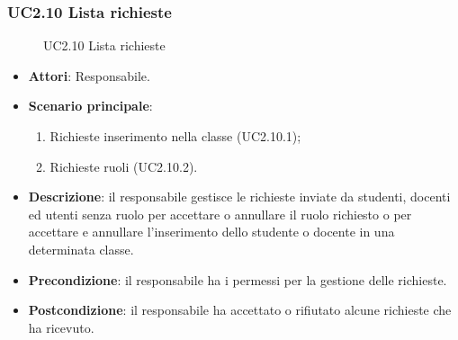 \subsubsection{UC2.10 Lista richieste}
\begin{figure}[H]
\centering
\noindent{}
\caption{UC2.10 Lista richieste}
\end{figure}
\begin{itemize}
\item \textbf{Attori}: Responsabile.
\item \textbf{Scenario principale}:
\begin{enumerate}
\item Richieste inserimento nella classe (UC2.10.1);
\item Richieste ruoli (UC2.10.2).
\end{enumerate}
\item \textbf{Descrizione}: il responsabile gestisce le richieste inviate da studenti, docenti ed utenti senza ruolo per accettare o annullare il ruolo richiesto o per accettare e annullare l'inserimento dello studente o docente in una determinata classe.
\item \textbf{Precondizione}: il responsabile ha i permessi per la gestione delle richieste.
\item \textbf{Postcondizione}: il responsabile ha accettato o rifiutato alcune richieste che ha ricevuto.
\end{itemize}
